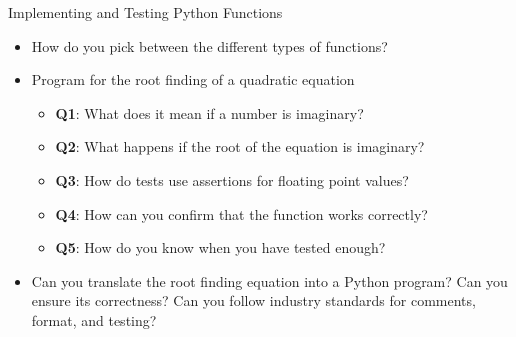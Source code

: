 \documentclass[14pt,aspectratio=169]{beamer}
\begin{document}
%
\begin{frame}{Implementing and Testing Python Functions}
  \begin{itemize}
    \item How do you pick between the different types of functions?
      \vspace*{-.35in}
    \item Program for the root finding of a quadratic equation
      \begin{itemize}
        \item {\bf Q1}: What does it mean if a number is imaginary?
        \item {\bf Q2}: What happens if the root of the equation is imaginary?
        \item {\bf Q3}: How do tests use assertions for floating point values?
        \item {\bf Q4}: How can you confirm that the function works correctly?
        \item {\bf Q5}: How do you know when you have tested enough?
      \end{itemize}
      \vspace*{-.2in}
    \item Can you translate the root finding equation into a Python program?
      Can you ensure its correctness? Can you follow industry standards for
      comments, format, and testing?
  \end{itemize}
\end{frame}
\end{document}
